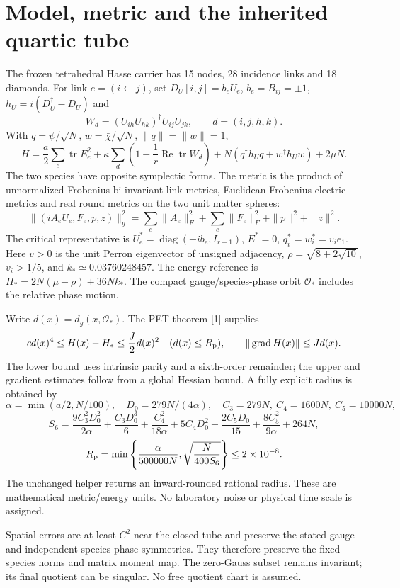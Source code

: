 \documentclass[11pt,a4paper]{article}
\newcommand{\tr}{\operatorname{tr}}\newcommand{\diag}{\operatorname{diag}}\newcommand{\Rea}{\operatorname{Re}}\newcommand{\grad}{\operatorname{grad}}
\begin{document}
\section{Model, metric and the inherited quartic tube}
The frozen tetrahedral Hasse carrier has 15 nodes, 28 incidence links and 18 diamonds. For link $e=(i\leftarrow j)$, set $D_U[i,j]=b_eU_e$, $b_e=B_{ij}=\pm1$, $h_U=i(D_U^\dagger-D_U)$ and
\[
W_d=(U_{ih}U_{hk})^\dagger U_{ij}U_{jk},\qquad d=(i,j,h,k).
\]
With $q=\psi/\sqrt N$, $w=\bar\chi/\sqrt N$, $\|q\|=\|w\|=1$,
\[
H=\frac a2\sum_e\tr E_e^2+\kappa\sum_d\left(1-\frac1r\Rea\tr W_d\right)
+N(q^\dagger h_Uq+w^\dagger h_Uw)+2\mu N.
\]
The two species have opposite symplectic forms. The metric is the product of unnormalized Frobenius bi-invariant link metrics, Euclidean Frobenius electric metrics and real round metrics on the two unit matter spheres:
\[
\|(iA_eU_e,F_e,p,z)\|_g^2
=\sum_e\|A_e\|_F^2+\sum_e\|F_e\|_F^2+\|p\|^2+\|z\|^2.
\]
The critical representative is $U_e^*=\diag(-ib_e,I_{r-1})$, $E^*=0$, $q_i^*=w_i^*=v_ie_1$. Here $v>0$ is the unit Perron eigenvector of unsigned adjacency, $\rho=\sqrt{8+2\sqrt{10}}$, $v_i>1/5$, and $k_*\simeq0.03760248457$. The energy reference is $H_*=2N(\mu-\rho)+36Nk_*$. The compact gauge/species-phase orbit $\mathcal O_*$ includes the relative phase motion.

Write $d(x)=d_g(x,\mathcal O_*)$. The PET theorem [1] supplies
\begin{equation}\label{eq:base}
c d(x)^4\le H(x)-H_*\le\frac J2 d(x)^2\quad(d(x)\le R_{\rm p}),
\qquad \|\grad H(x)\|\le Jd(x).
\end{equation}
The lower bound uses intrinsic parity and a sixth-order remainder; the upper and gradient estimates follow from a global Hessian bound. A fully explicit radius is obtained by
\[
\alpha=\min(a/2,N/100),\quad D_0=279N/(4\alpha),
\quad C_3=279N,\ C_4=1600N,\ C_5=10000N,
\]
\[
S_6=\frac{9C_3^2D_0^2}{2\alpha}+\frac{C_3D_0^3}{6}
+\frac{C_4^2}{18\alpha}+5C_4D_0^2+\frac{2C_5D_0}{15}+\frac{8C_5^2}{9\alpha}+264N,
\]
\[
R_{\rm p}=\min\left\{\frac\alpha{500000N},\sqrt{\frac N{400S_6}}\right\}
\le2\times10^{-8}.
\]
The unchanged helper returns an inward-rounded rational radius. These are mathematical metric/energy units. No laboratory noise or physical time scale is assigned.

Spatial errors are at least $C^2$ near the closed tube and preserve the stated gauge and independent species-phase symmetries. They therefore preserve the fixed species norms and matrix moment map. The zero-Gauss subset remains invariant; its final quotient can be singular. No free quotient chart is assumed.
\newpage
\end{document}
